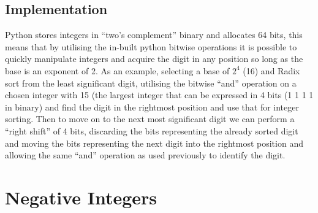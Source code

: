 \documentclass[12pt]{article}
\begin{document}
	\subsection{Implementation}
	Python stores integers in “two’s complement” binary and allocates 64 bits, this means that by utilising the in-built python bitwise operations it is possible to quickly manipulate integers and acquire the digit in any position so long as the base is an exponent of 2.
	\newline
	As an example, selecting a base of $2^{4}$ (16) and Radix sort from the least significant digit, utilising the bitwise “and” operation on a chosen integer with 15 (the largest integer that can be expressed in 4 bits (1 1 1 1 in binary) and find the digit in the rightmost position and use that for integer sorting. Then to move on to the next most significant digit we can perform a “right shift” of 4 bits, discarding the bits representing the already sorted digit and moving the bits representing the next digit into the rightmost position and allowing the same “and” operation as used previously to identify the digit.
	\pagebreak
	\section{Negative Integers}
\end{document}
